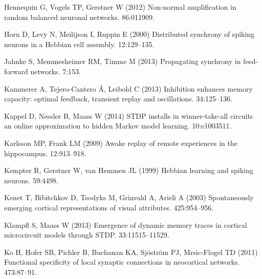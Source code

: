 \begin{thebibliography}{}
Hennequin G, Vogels TP, Gerstner W (2012{\rm{}})
\newblock Non-normal amplification in random balanced neuronal networks.
 86:011909.

Horn D, Levy N, Meilijson I, Ruppin E (2000{\rm{}})
\newblock Distributed synchrony of spiking neurons in a Hebbian cell assembly.
 12:129--135.

Jahnke S, Memmesheimer RM, Timme M (2013{\rm{}})
\newblock Propagating synchrony in feed-forward networks.
 7:153.

Kammerer A, Tejero-Cantero {\'A}, Leibold C (2013{\rm{}})
\newblock Inhibition enhances memory capacity: optimal feedback, transient
  replay and oscillations.
 34:125--136.

Kappel D, Nessler B, Maass W (2014{\rm{}})
\newblock STDP installs in winner-take-all circuits an online approximation to hidden Markov model learning.
 10:e1003511.

Karlsson MP, Frank LM (2009{\rm{}})
\newblock Awake replay of remote experiences in the hippocampus.
 12:913--918.

Kempter R, Gerstner W, van Hemmen JL (1999{\rm{}})
\newblock Hebbian learning and spiking neurons.
 59:4498.

Kenet T, Bibitchkov D, Tsodyks M, Grinvald A, Arieli A (2003{\rm{}})
\newblock Spontaneously emerging cortical representations of visual attributes.
 425:954--956.

Klampfl S, Maass W (2013{\rm{}})
\newblock Emergence of dynamic memory traces in cortical microcircuit models
  through STDP.
 33:11515--11529.

Ko H, Hofer SB, Pichler B, Buchanan KA, Sj\"{o}str{\"o}m PJ, Mrsic-Flogel TD (2011{\rm{}})
\newblock Functional specificity of local synaptic connections in neocortical
  networks.
 473:87--91.


\end{thebibliography}
